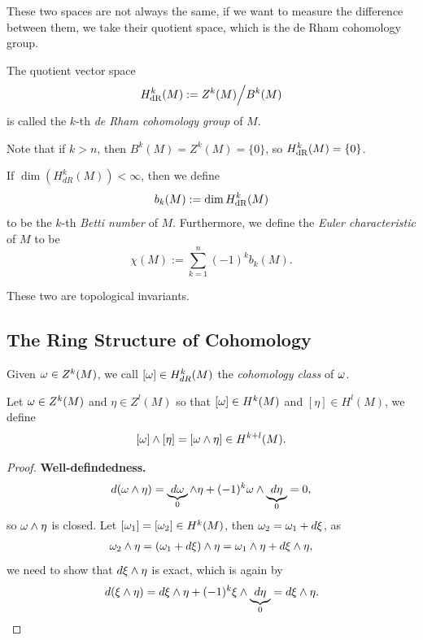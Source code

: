 These two spaces are not always the same, if we want to measure the difference between them, we take their quotient space, which is the de Rham cohomology group.
\begin{definition}
    The quotient vector space \[
        H_{\mathrm{dR}}^k(M) := Z^k(M) \Big/ B^k(M)
    \] is called the \(k\)-th \emph{de Rham cohomology group} of \(M\).
\end{definition}
Note that if \(k > n\), then \(B^k(M) = Z^k(M) = \{0\}\), so \(H_{\mathrm{dR}}^k(M) = \{0\}\).

\begin{definition}
    If \(\dim(H_{dR}^k(M)) <\infty\), then we define \[
        b_k(M) := \dim H_{\mathrm{dR}}^k(M)
    \] to be the \(k\)-th \emph{Betti number} of \(M\). Furthermore, we define the \emph{Euler characteristic} of \(M\) to be \[
        \chi(M) := \sum_{k=1}^n(-1)^k b_k(M).
    \]
\end{definition}
These two are topological invariants. 

\subsection*{The Ring Structure of Cohomology}

\begin{definition}
    Given \(\omega\in Z^k(M)\), we call \([\omega] \in H_{dR}^k(M)\) the \emph{cohomology class} of \(\omega\).
\end{definition}

\begin{definition}[\(\wed\) on \(H^k(M)\)]
    Let \(\omega\in Z^k(M)\) and \(\eta\in Z^l(M)\) so that \([\omega]\in H^k(M)\) and \([\eta]\in H^l(M)\), we define \[
        [\omega]\wedge[\eta] = [\omega\wedge\eta]\in H^{k+l}(M).
    \]
\end{definition}
\begin{proof}
    \textbf{Well-defindedness.}
    \begin{align*}
        d(\omega\wedge\eta) = \underbrace{d\omega}_0\wedge\eta + (-1)^k\omega\wedge \underbrace{d\eta}_0 = 0,
    \end{align*} so \(\omega\wedge\eta\) is closed.
    Let \([\omega_1] = [\omega_2]\in H^k(M)\), then \(\omega_2 = \omega_1 + d\xi\), as \begin{align*}
        \omega_2\wedge\eta
        = (\omega_1 + d\xi)\wedge\eta
        = \omega_1\wedge\eta + d\xi\wedge\eta,
    \end{align*} we need to show that \(d\xi\wedge\eta\) is exact, which is again by \begin{align*}
        d(\xi\wedge\eta)
        = d\xi\wedge\eta + (-1)^k\xi\wedge \underbrace{d\eta}_0
        = d\xi\wedge\eta.
    \end{align*}
\end{proof}

